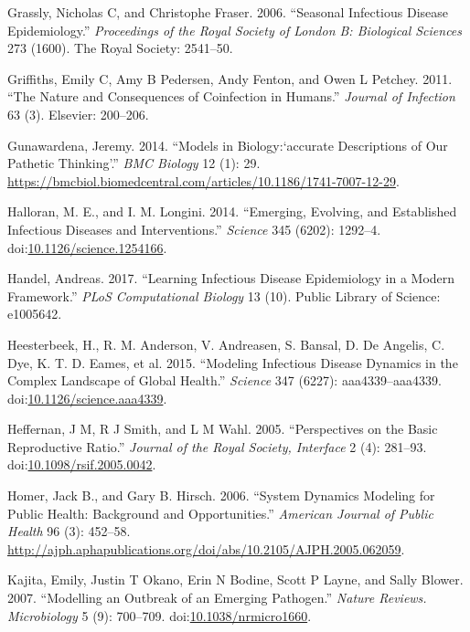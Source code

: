 \documentclass[]{book}
\theoremstyle{definition}
\theoremstyle{definition}
\theoremstyle{definition}
\theoremstyle{remark}
\begin{document}
\hypertarget{ref-grassly06}{}
Grassly, Nicholas C, and Christophe Fraser. 2006. ``Seasonal Infectious
Disease Epidemiology.'' \emph{Proceedings of the Royal Society of London
B: Biological Sciences} 273 (1600). The Royal Society: 2541--50.

\hypertarget{ref-griffiths11}{}
Griffiths, Emily C, Amy B Pedersen, Andy Fenton, and Owen L Petchey.
2011. ``The Nature and Consequences of Coinfection in Humans.''
\emph{Journal of Infection} 63 (3). Elsevier: 200--206.

\hypertarget{ref-gunawardena14}{}
Gunawardena, Jeremy. 2014. ``Models in Biology:`accurate Descriptions of
Our Pathetic Thinking'.'' \emph{BMC Biology} 12 (1): 29.
\url{https://bmcbiol.biomedcentral.com/articles/10.1186/1741-7007-12-29}.

\hypertarget{ref-halloran14}{}
Halloran, M. E., and I. M. Longini. 2014. ``Emerging, Evolving, and
Established Infectious Diseases and Interventions.'' \emph{Science} 345
(6202): 1292--4.
doi:\href{https://doi.org/10.1126/science.1254166}{10.1126/science.1254166}.

\hypertarget{ref-handel17}{}
Handel, Andreas. 2017. ``Learning Infectious Disease Epidemiology in a
Modern Framework.'' \emph{PLoS Computational Biology} 13 (10). Public
Library of Science: e1005642.

\hypertarget{ref-heesterbeek15}{}
Heesterbeek, H., R. M. Anderson, V. Andreasen, S. Bansal, D. De Angelis,
C. Dye, K. T. D. Eames, et al. 2015. ``Modeling Infectious Disease
Dynamics in the Complex Landscape of Global Health.'' \emph{Science} 347
(6227): aaa4339--aaa4339.
doi:\href{https://doi.org/10.1126/science.aaa4339}{10.1126/science.aaa4339}.

\hypertarget{ref-heffernan05}{}
Heffernan, J M, R J Smith, and L M Wahl. 2005. ``Perspectives on the
Basic Reproductive Ratio.'' \emph{Journal of the Royal Society,
Interface} 2 (4): 281--93.
doi:\href{https://doi.org/10.1098/rsif.2005.0042}{10.1098/rsif.2005.0042}.

\hypertarget{ref-homer06}{}
Homer, Jack B., and Gary B. Hirsch. 2006. ``System Dynamics Modeling for
Public Health: Background and Opportunities.'' \emph{American Journal of
Public Health} 96 (3): 452--58.
\url{http://ajph.aphapublications.org/doi/abs/10.2105/AJPH.2005.062059}.

\hypertarget{ref-kajita07}{}
Kajita, Emily, Justin T Okano, Erin N Bodine, Scott P Layne, and Sally
Blower. 2007. ``Modelling an Outbreak of an Emerging Pathogen.''
\emph{Nature Reviews. Microbiology} 5 (9): 700--709.
doi:\href{https://doi.org/10.1038/nrmicro1660}{10.1038/nrmicro1660}.
\end{document}
